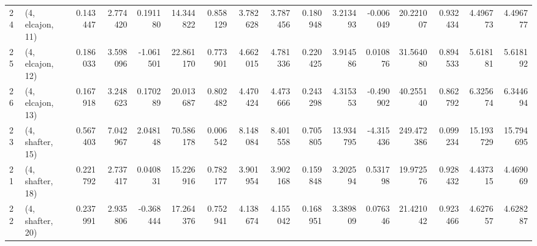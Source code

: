 \begin{tabular}{llrrrrrrrrrrrrrr}
24 &  (4, elcajon, 11) &   0.143447 &  2.774420 &  0.191180 &  14.344822 &  0.858129 &   3.782628 &  3.787456 &  0.180948 &   3.213493 &  -0.006049 &   20.221007 &  0.932434 &   4.496773 &   4.496777 \\
25 &  (4, elcajon, 12) &   0.186033 &  3.598096 & -1.061501 &  22.861170 &  0.773901 &   4.662015 &  4.781336 &  0.220425 &   3.914586 &   0.010876 &   31.564080 &  0.894533 &   5.618181 &   5.618192 \\
26 &  (4, elcajon, 13) &   0.167918 &  3.248623 &  0.170289 &  20.013687 &  0.802482 &   4.470424 &  4.473666 &  0.243298 &   4.315353 &  -0.490902 &   40.255140 &  0.862792 &   6.325674 &   6.344694 \\
23 &  (4, shafter, 15) &   0.567403 &  7.042967 &  2.048148 &  70.586178 &  0.006542 &   8.148084 &  8.401558 &  0.705805 &  13.934795 &  -4.315436 &  249.472386 &  0.099234 &  15.193729 &  15.794695 \\
21 &  (4, shafter, 18) &   0.221792 &  2.737417 &  0.040831 &  15.226916 &  0.782177 &   3.901954 &  3.902168 &  0.159848 &   3.202594 &   0.531798 &   19.972576 &  0.928432 &   4.437315 &   4.469069 \\
22 &  (4, shafter, 20) &   0.237991 &  2.935806 & -0.368444 &  17.264376 &  0.752941 &   4.138674 &  4.155042 &  0.168951 &   3.389809 &   0.076346 &   21.421042 &  0.923466 &   4.627657 &   4.628287 \\
\bottomrule
\end{tabular}

